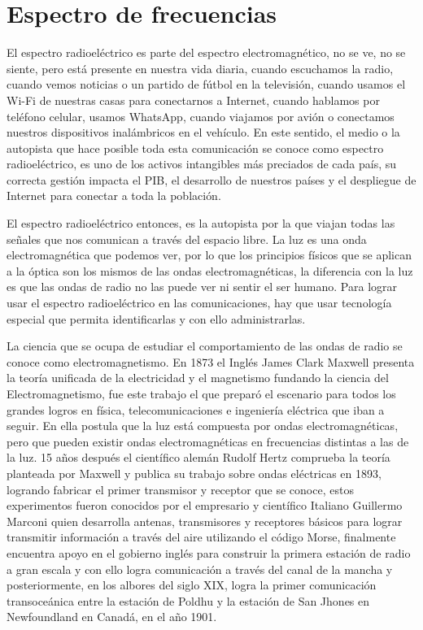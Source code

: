 \section{Espectro de frecuencias}
\label{sec:comunicaciones.a.bordo.espectro.frecuencias}

El espectro radioeléctrico es parte del espectro electromagnético, no se ve, no se siente, pero está presente en nuestra vida diaria, cuando escuchamos la radio, cuando vemos noticias o un partido de fútbol en la televisión, cuando usamos el Wi-Fi de nuestras casas para conectarnos a Internet, cuando hablamos por teléfono celular, usamos WhatsApp, cuando viajamos por avión o conectamos nuestros dispositivos inalámbricos en el vehículo. En este sentido, el medio o la autopista que hace posible toda esta comunicación se conoce como espectro radioeléctrico, es uno de los activos intangibles más preciados de cada país, su correcta gestión impacta el PIB, el desarrollo de nuestros países y el despliegue de Internet para conectar a toda la población.

El espectro radioeléctrico entonces, es la autopista por la que viajan todas las señales que nos comunican a través del espacio libre. La luz es una onda electromagnética que podemos ver, por lo que los principios físicos que se aplican a la óptica son los mismos de las ondas electromagnéticas, la diferencia con la luz es que las ondas de radio no las puede ver ni sentir el ser humano. Para lograr usar el espectro radioeléctrico en las comunicaciones, hay que usar tecnología especial que permita identificarlas y con ello administrarlas.

La ciencia que se ocupa de estudiar el comportamiento de las ondas de radio se conoce como electromagnetismo. En 1873 el Inglés James Clark Maxwell presenta la teoría unificada de la electricidad y el magnetismo fundando la ciencia del Electromagnetismo, fue este trabajo el que preparó el escenario para todos los grandes logros en física, telecomunicaciones e ingeniería eléctrica que iban a seguir. En ella postula que la luz está compuesta por ondas electromagnéticas, pero que pueden existir ondas electromagnéticas en frecuencias distintas a las de la luz. 15 años después el científico alemán Rudolf Hertz comprueba la teoría planteada por Maxwell y publica su trabajo sobre ondas eléctricas en 1893, logrando fabricar el primer transmisor y receptor que se conoce, estos experimentos fueron conocidos por el empresario y científico Italiano Guillermo Marconi quien desarrolla antenas, transmisores y receptores básicos para lograr transmitir información a través del aire utilizando el código Morse, finalmente encuentra apoyo en el gobierno inglés para construir la primera estación de radio a gran escala y con ello logra comunicación a través del canal de la mancha y posteriormente, en los albores del siglo XIX, logra la primer comunicación transoceánica entre la estación de Poldhu y la estación de San Jhones en Newfoundland en Canadá, en el año 1901.

